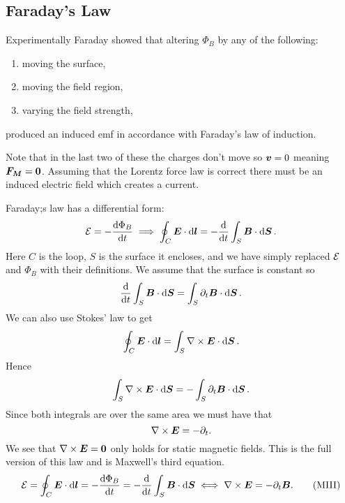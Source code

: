     \subsection{Faraday's Law}
    Experimentally Faraday showed that altering \(\Phi_B\) by any of the following:
    \begin{enumerate}
        \item moving the surface,
        \item moving the field region,
        \item varying the field strength,
    \end{enumerate}
    produced an induced \gls{emf} in accordance with Faraday's law of induction.
    
    Note that in the last two of these the charges don't move so \(\bm{v} = 0\) meaning \(\bm{F_M} = \bm{0}\).
    Assuming that the Lorentz force law is correct there must be an induced electric field which creates a current.
    
    Faraday;s law has a differential form:
    \[\mathcal{E} = -\dv{\Phi_B}{t} \implies \oint_C\bm{E}\cdot\dd{\bm{l}} = -\dv{t}\int_S\bm{B}\cdot\dd{\bm{S}}.\]
    Here \(C\) is the loop, \(S\) is the surface it encloses, and we have simply replaced \(\mathcal{E}\) and \(\Phi_B\) with their definitions.
    We assume that the surface is constant so
    \[\dv{t}\int_S\bm{B}\cdot\dd{\bm{S}} = \int_S\partial_t\bm{B}\cdot\dd{\bm{S}}.\]
    We can also use Stokes' law to get
    \[\oint_C\bm{E}\cdot\dd{\bm{l}} = \int_S\nabla\times\bm{E}\cdot\dd{\bm{S}}.\]
    Hence
    \[\int_S\nabla\times\bm{E}\cdot\dd{\bm{S}} = -\int_S\partial_t\bm{B}\cdot\dd{\bm{S}}.\]
    Since both integrals are over the same area we must have that
    \[\nabla\times\bm{E} = -\partial_t.\]
    We see that \(\nabla\times\bm{E} = \bm{0}\) only holds for static magnetic fields.
    This is the full version of this law and is Maxwell's third equation.
    \[\mathcal{E} = \oint_C\bm{E}\cdot\dd{\bm{l}} = -\dv{\Phi_B}{t} = -\dv{t}\int_S\bm{B}\cdot\dd{\bm{S}} \iff \nabla\times\bm{E} = -\partial_t\bm{B}. \tag{MIII}\]
    
